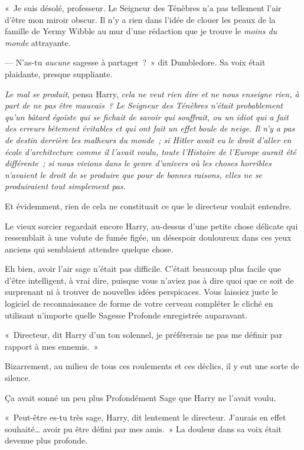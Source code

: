«~Je suis désolé, professeur.
Le Seigneur des Ténèbres n'a pas tellement l'air d'être mon miroir obscur.
Il n'y a rien dans l'idée de clouer les peaux de la famille de Yermy Wibble au mur d'une rédaction que je trouve le \emph{moins du monde} attrayante.

--- N'as-tu \emph{aucune} sagesse à partager~?~»
dit Dumbledore.
Sa voix était plaidante, presque suppliante.

\emph{Le mal se produit}, pensa Harry, \emph{cela ne veut rien dire et ne nous enseigne rien, à part de ne pas être mauvais~?
Le Seigneur des Ténèbres n'était probablement qu'un bâtard égoïste qui se fichait de savoir qui souffrait, ou un idiot qui a fait des erreurs bêtement évitables et qui ont fait un effet boule de neige.
Il n'y a pas de destin derrière les malheurs du monde~; si Hitler avait eu le droit d'aller en école d'architecture comme il l'avait voulu, toute l'Histoire de l'Europe aurait été différente~; si nous vivions dans le genre d'univers où les choses horribles n'avaient le droit de se produire que pour de bonnes raisons, elles ne se produiraient tout simplement pas.}

Et évidemment, rien de cela ne constituait ce que le directeur voulait entendre.

Le vieux sorcier regardait encore Harry, au-dessus d'une petite chose délicate qui ressemblait à une volute de fumée figée, un désespoir douloureux dans ces yeux anciens qui semblaient attendre quelque chose.

Eh bien, avoir l'air sage n'était pas difficile.
C'était beaucoup plus facile que d'être intelligent, à vrai dire, puisque vous n'aviez pas à dire quoi que ce soit de surprenant ni à trouver de nouvelles idées perspicaces.
Vous laissiez juste le logiciel de reconnaissance de forme de votre cerveau compléter le cliché en utilisant n'importe quelle Sagesse Profonde enregistrée auparavant.

«~Directeur, dit Harry d'un ton solennel, je préférerais ne pas me définir par rapport à mes ennemis.~»

Bizarrement, au milieu de tous ces roulements et ces déclics, il y eut une sorte de silence.

Ça avait sonné un peu plus Profondément Sage que Harry ne l'avait voulu.

«~Peut-être es-tu très sage, Harry, dit lentement le directeur.
J'aurais en effet souhaité… avoir pu être défini par mes amis.~»
La douleur dans sa voix était devenue plus profonde.

